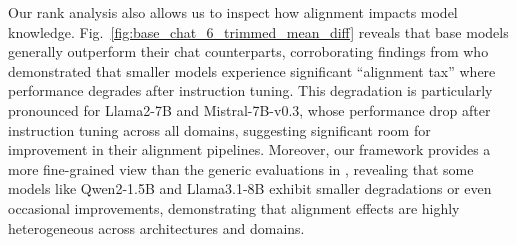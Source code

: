 \documentclass[10pt]{article}
\begin{document}


Our rank analysis also allows us to inspect how alignment impacts model knowledge. Fig.~\ref{fig:base_chat_6_trimmed_mean_diff} reveals that base models generally outperform their chat counterparts, corroborating findings from \citet{bai2022training} who demonstrated that smaller models experience significant ``alignment tax'' where performance degrades after instruction tuning. This degradation is particularly pronounced for Llama2-7B and Mistral-7B-v0.3, whose performance drop after instruction tuning across all domains, suggesting significant room for improvement in their alignment pipelines. 
Moreover, our framework provides a more fine-grained view than the generic evaluations in \citet{bai2022training}, revealing that some models like Qwen2-1.5B and Llama3.1-8B exhibit smaller degradations or even occasional improvements, demonstrating that alignment effects are highly heterogeneous across architectures and domains.
\end{document}
